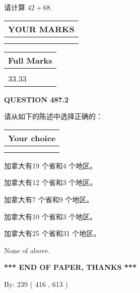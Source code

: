 \documentclass{ctexart}
\begin{document}
  
 
请计算 $ %
42 +  %
68 $.
 

 

 
  
\vspace{0.2in}
  
\noindent\begin{tabular}{|l|}
\hline
 YOUR MARKS  \\
\hline
 \\ 
 \\ 
\hline
\end{tabular}
\hspace{0.05in} \begin{tabular}{|l|}
\hline
 Full Marks  \\
\hline
 \\ 
33.33 \\
\hline
\end{tabular}
{\textbf{\Large{QUESTION
487.2 
}}}
  
  
请从如下的陈述中选择正确的：
  
  
\noindent\hspace{3.0in} \begin{tabular}{|l|}
\hline
Your choice \\
\hline
 \\ 
 \\ 
\hline
\end{tabular}
  
  
 
 
加拿大有19 个省和4 个地区。
 
 
加拿大有12 个省和3 个地区。
 
 
加拿大有7 个省和9 个地区。
 
 
加拿大有10 个省和3 个地区。
 
 
加拿大有25 个省和31 个地区。
 
 
 None of above.
 
 
   
   
 \vspace{0.2in}
 
   
   
   
   
\vspace{1.0in} 
{\textbf{\large{ *** END OF PAPER, THANKS *** }}} 
   
   
\hspace{1.0in} By: 
 239 ( 416 ,  613 )
   
\end{document}
